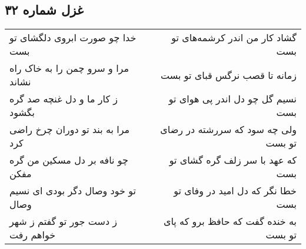 \begin{center}
\section*{غزل شماره ۳۲}
\label{sec:sh032}
\begin{longtable}{l p{0.5cm} r}
خدا چو صورت ابروی دلگشای تو بست
&&
گشاد کار من اندر کرشمه‌های تو بست
\\
مرا و سرو چمن را به خاک راه نشاند
&&
زمانه تا قصب نرگس قبای تو بست
\\
ز کار ما و دل غنچه صد گره بگشود
&&
نسیم گل چو دل اندر پی هوای تو بست
\\
مرا به بند تو دوران چرخ راضی کرد
&&
ولی چه سود که سررشته در رضای تو بست
\\
چو نافه بر دل مسکین من گره مفکن
&&
که عهد با سر زلف گره گشای تو بست
\\
تو خود وصال دگر بودی ای نسیم وصال
&&
خطا نگر که دل امید در وفای تو بست
\\
ز دست جور تو گفتم ز شهر خواهم رفت
&&
به خنده گفت که حافظ برو که پای تو بست
\\
\end{longtable}
\end{center}
